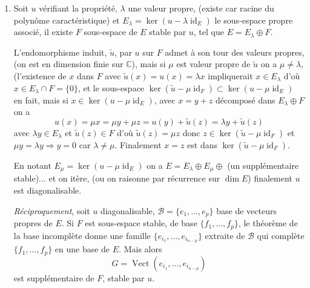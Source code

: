 \begin{enumerate}[label=\arabic*.,leftmargin=2.2em,itemsep=1.1em]
\item Soit $u$ vérifiant la propriété, $\lambda$ une valeur propre, (existe car racine du polynôme caractéristique) et $E_\lambda=\ker(u-\lambda\operatorname{id}_E)$ le sous-espace propre associé, il existe $F$ sous-espace de $E$ stable par $u$, tel que $E=E_\lambda\oplus F$.

L'endomorphisme induit, $\widetilde u$, par $u$ sur $F$ admet à son tour des valeurs propres, (on est en dimension finie sur $\mathbb C$), mais si $\mu$ est valeur propre de $\widetilde u$ on a $\mu\ne\lambda$, (l'existence de $x$ dans $F$ avec $\widetilde u(x)=u(x)=\lambda x$ impliquerait $x\in E_\lambda$ d'où $x\in E_\lambda\cap F=\{0\}$, et le sous-espace $\ker(\widetilde u-\mu\operatorname{id}_F)\subset\ker(u-\mu\operatorname{id}_E)$ en fait, mais si $x\in\ker(u-\mu\operatorname{id}_E)$, avec $x=y+z$ décomposé dans $E_\lambda\oplus F$ on a
\[
u(x)=\mu x=\mu y+\mu z=u(y)+\widetilde u(z)=\lambda y+\widetilde u(z)
\]
avec $\lambda y\in E_\lambda$ et $\widetilde u(z)\in F$ d'où $\widetilde u(z)=\mu z$ donc $z\in\ker(\widetilde u-\mu\operatorname{id}_F)$ et $\mu y=\lambda y\Rightarrow y=0$ car $\lambda\ne\mu$. Finalement $x=z$ est dans $\ker(\widetilde u-\mu\operatorname{id}_F)$.

En notant $E_\mu=\ker(u-\mu\operatorname{id}_E)$ on a $E=E_\lambda\oplus E_\mu\oplus$ (un supplémentaire stable)... et on itère, (ou on raisonne par récurrence sur $\dim E$) finalement $u$ est diagonalisable.

\emph{Réciproquement}, soit $u$ diagonalisable, $\mathcal B=\{e_1,\ldots,e_p\}$ base de vecteurs propres de $E$. Si $F$ est sous-espace stable, de base $\{f_1,\ldots,f_p\}$, le théorème de la base incomplète donne une famille $\{e_{i_1},\ldots,e_{i_{n-p}}\}$ extraite de $\mathcal B$ qui complète $\{f_1,\ldots,f_p\}$ en une base de $E$. Mais alors
\[
G=\operatorname{Vect}(e_{i_1},\ldots,e_{i_{n-p}})
\]
est supplémentaire de $F$, stable par $u$.

\end{enumerate}
